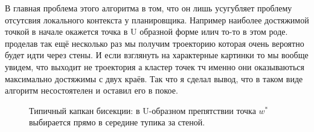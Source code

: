 В главная проблема этого алгоритма в том, что он лишь усугубляет проблему отсутсвия локального контекста у планировщика. Например наиболее достяжимой точкой в начале окажется точка в U образной форме илич то-то в этом роде. проделав так ещё несколько раз мы получим троекторию которая очень вероятно будет идти через стены. И если взглянуть на характерные картинки то мы вообще увидем, что выходит не троектория а кластер точек тч именно они оказываються максимально достяжимы с двух краёв. Так что я сделал вывод, что в таком виде алгоритм несостоятелен и оставил его в покое.


\begin{figure}[t]
    \centering
    
    \caption{Типичный капкан бисекции: в U-образном препятствии точка $w^*$ выбирается прямо в середине тупика за стеной.}
    \label{fig:bisection_failure}
\end{figure}
